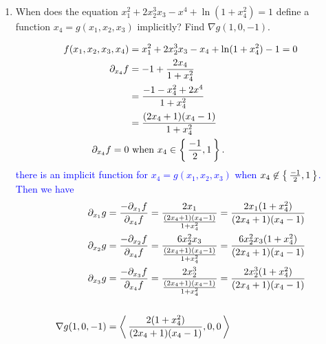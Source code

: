 \documentclass[10pt,a4paper]{report}
\newcommand{\BLUE}[1]{\textcolor{blue}{#1}}
\begin{document}
\begin{enumerate}[label=\Roman*.]
	\newpage
	\item When does the equation $x_1^2+2x_2^3x_3-x^4+\ln(1+x_4^2)=1$ define a function $x_4=g(x_1,x_2,x_3)$ implicitly? Find $\nabla g(1,0,-1)$.
	
	\BLUE{\begin{align*}
		f(x_1,x_2,x_3, x_4) &= x_1^2+2x_2^3x_3-x_4+\ln(1+x_4^2)-1 = 0 \\
		\partial_{x_4} f &= -1 + \frac{2x_4}{1+x_4^2} \\
		&= \frac{-1-x_4^2+2x^4}{1+x_4^2} \\
		&= \frac{(2x_4+1)(x_4-1)}{1+x_4^2} \\
		\partial_{x_4} f = 0 &\text{ when } x_4 \in \left \{\,  \frac{-1}{2}, 1 \,\right \}.
	\end{align*} there is an implicit function for $x_4=g(x_1,x_2,x_3)$ when $x_4 \not \in \left \{\,  \frac{-1}{2}, 1 \,\right \}$.  Then we have 
	\begin{align*}
		\partial_{x_1} g &= \frac{-\partial_{x_1}f}{\partial_{x_4}f} = \frac{2x_1}{\frac{(2x_4+1)(x_4-1)}{1+x_4^2}} = \frac{2x_1(1+x_4^2)}{(2x_4+1)(x_4-1)} \\
		\partial_{x_2} g &= \frac{-\partial_{x_2}f}{\partial_{x_4}f} = \frac{6x_2^2x_3}{\frac{(2x_4+1)(x_4-1)}{1+x_4^2}} = \frac{6x_2^2x_3(1+x_4^2)}{(2x_4+1)(x_4-1)} \\
		\partial_{x_3} g &= \frac{-\partial_{x_3}f}{\partial_{x_4}f} = \frac{2x_2^3}{\frac{(2x_4+1)(x_4-1)}{1+x_4^2}} = \frac{2x_2^3(1+x_4^2)}{(2x_4+1)(x_4-1)} \\ \\
		\nabla g(1,0,-1) &= \left \langle\,  \frac{2(1+x_4^2)}{(2x_4+1)(x_4-1)}, 0, 0   \,\right \rangle
	\end{align*}
	}
\end{enumerate}
\end{document}
